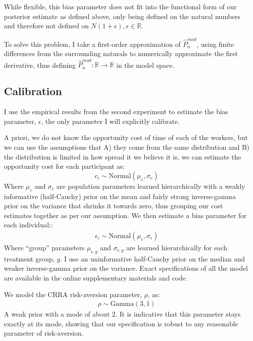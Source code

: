 \documentclass[a4paper,12pt]{article}
\begin{document}
While flexible, this bias parameter does not fit into the functional form of our posterior estimate as defined above, only being defined on the natural numbers and therefore not defined on $N(1 + \epsilon), \epsilon \in \mathbb{R}$. 

To solve this problem, I take a first-order approximation of $\hat{P}^{mod}_n$, using finite differences from the surrounding naturals to numerically approximate the first derivative, thus defining $\hat{P}^{mod}_n: \mathbb{R} \rightarrow \mathbb{R}$ in the model space.

\subsection{ Calibration }

I use the empirical results from the second experiment to estimate the bias parameter, $\epsilon$, the only parameter I will explicitly calibrate.

A priori, we do not know the opportunity cost of time of each of the workers, but we can use the assumptions that A) they come from the same distribution and B) the distribution is limited in how spread it we believe it is, we can estimate the opportunity cost for each participant as:
$$
c_i \sim \text{Normal}(\mu_c, \sigma_c)
$$
Where $\mu_c$ and $\sigma_c$ are population parameters learned hierarchically with a weakly informative (half-Cauchy) prior on the mean and fairly strong inverse-gamma prior on the variance that shrinks it towards zero, thus grouping our cost estimates together as per our assumption. We then estimate a bias parameter for each individual::
\begin{align*}
  \epsilon_i \sim \text{Normal}(\mu_{\epsilon}, \sigma_{\epsilon})
\end{align*}
Where ``group'' parameters $\mu_{\epsilon, g}$ and $\sigma_{\epsilon, g}$ are learned hierarchically for each treatment group, $g$. I use an uninformative half-Cauchy prior on the median and weaker inverse-gamma prior on the variance. Exact specifications of all the model are available in the online supplementary materials and code.

We model the CRRA risk-aversion parameter, $\rho$, as:
\begin{align*}
  \rho \sim \text{Gamma}(3, 1)
\end{align*}
A weak prior with a mode of about 2. It is indicative that this parameter stays exactly at its mode, showing that our specification is robust to any reasonable parameter of risk-aversion. 
\end{document}
